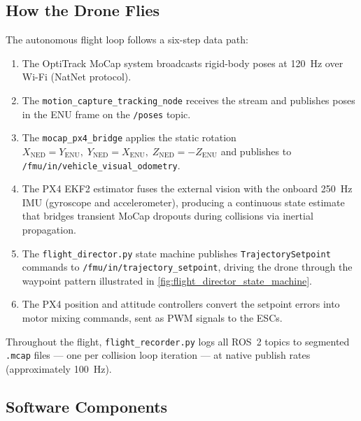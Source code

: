 \subsection{How the Drone Flies}

The autonomous flight loop follows a six-step data path:

\begin{enumerate}
    \item The OptiTrack MoCap system broadcasts rigid-body poses at 120~Hz over Wi-Fi (NatNet protocol).
    \item The \texttt{motion\_capture\_tracking\_node} receives the stream and publishes poses in the ENU frame on the \texttt{/poses} topic.
    \item The \texttt{mocap\_px4\_bridge} applies the static rotation $X_{\mathrm{NED}} = Y_{\mathrm{ENU}},\; Y_{\mathrm{NED}} = X_{\mathrm{ENU}},\; Z_{\mathrm{NED}} = -Z_{\mathrm{ENU}}$ and publishes to \texttt{/fmu/in/vehicle\_visual\_odometry}.
    \item The PX4 EKF2 estimator fuses the external vision with the onboard 250~Hz IMU (gyroscope and accelerometer), producing a continuous state estimate that bridges transient MoCap dropouts during collisions via inertial propagation.
    \item The \texttt{flight\_director.py} state machine publishes \texttt{TrajectorySetpoint} commands to \texttt{/fmu/in/trajectory\_setpoint}, driving the drone through the waypoint pattern illustrated in \autoref{fig:flight_director_state_machine}.
    \item The PX4 position and attitude controllers convert the setpoint errors into motor mixing commands, sent as PWM signals to the ESCs.
\end{enumerate}

Throughout the flight, \texttt{flight\_recorder.py} logs all ROS~2 topics to segmented \texttt{.mcap} files --- one per collision loop iteration --- at native publish rates (approximately 100~Hz).

\subsection{Software Components}

